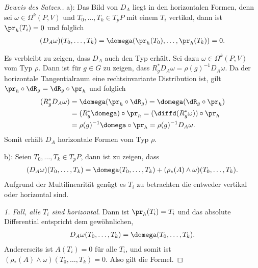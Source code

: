 \documentclass[%
	paper=a5,%
	fleqn,%
	DIV=18,%
	BCOR=0mm,
	fontsize=11pt,
	titlepage=false,%
	bibliography=totoc,
	DIV=18,%
	twoside=true,
	pdftitle=Riemannsche Geometrie,
	pdfauthor=Uwe Semmelmann,
	numbers=noendperiod]%
	{scrbook}
\begin{document}
\begin{proof}[Beweis des Satzes.]
a): Das Bild von $D_A$ liegt in den horizontalen Formen, denn sei
$\omega\in\Omega^k(P,V)$ und $T_0,\ldots,T_k\in T_pP$ mit einem $T_i$ vertikal,
dann ist $\pr_h(T_i) = 0$ und folglich
\begin{align*}
(D_A\omega)(T_0,\ldots,T_k) = \domega(\pr_h(T_0),\ldots,\pr_h(T_k)) = 0.
\end{align*}

Es verbleibt zu zeigen, dass $D_A$ auch den Typ erhält. Sei dazu
$\omega\in\Omega^k(P,V)$ vom Typ $\rho$. Dann ist für $g\in G$ zu
zeigen, dass $R_g^*D_A\omega = \rho(g)^{-1}D_A\omega$. Da der horizontale
Tangentialraum eine rechtsinvariante Distribution ist, gilt $\pr_h\circ \dR_g =
\dR_g\circ \pr_h$ und folglich
\begin{align*}
(R_g^* D_A \omega) &
= \domega(\pr_h\circ \dR_g)
= \domega(\dR_g\circ \pr_h)\\
&= (R_g^*\domega)\circ\pr_h
= (\diffd (R_g^*\omega))\circ\pr_h\\
&= \rho(g)^{-1} \domega\circ\pr_h
=\rho(g)^{-1} D_A\omega.
\end{align*}
Somit erhält $D_A$ horizontale Formen vom Typ $\rho$.

b): Seien $T_0,\ldots,T_k\in T_pP$, dann ist zu zeigen, dass
\begin{align*}
(D_A\omega)(T_0,\ldots,T_k) = 
\domega(T_0,\ldots,T_k) + (\rho_*(A)\wedge \omega)(T_0,\ldots,T_k).
\end{align*}
Aufgrund der Multilinearität genügt es $T_i$ zu betrachten die
entweder vertikal oder horizontal sind.

\textit{1. Fall, alle $T_i$ sind horizontal}. Dann ist $\pr_h(T_i) = T_i$ und
das absolute Differential entspricht dem gewöhnlichen,
\begin{align*}
D_A\omega(T_0,\ldots,T_k) = \domega(T_0,\ldots,T_k).
\end{align*}
Andererseits ist $A(T_i) = 0$ für alle $T_i$, und somit ist $(\rho_*(A)\wedge
\omega)(T_0,\ldots,T_k) = 0$. Also gilt die Formel.


\end{proof}
\end{document}
